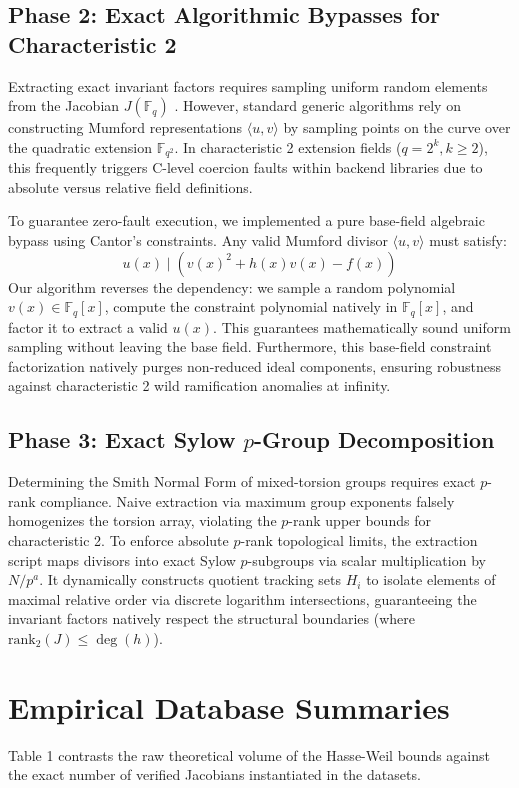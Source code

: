 \documentclass[letterpaper, 11pt]{article}
\begin{document}
\subsection{Phase 2: Exact Algorithmic Bypasses for Characteristic 2}
Extracting exact invariant factors requires sampling uniform random elements from the Jacobian $J(\mathbb{F}_q)$ \cite{Sutherland2007}. However, standard generic algorithms rely on constructing Mumford representations $\langle u, v \rangle$ \cite{Cantor1987} by sampling points on the curve over the quadratic extension $\mathbb{F}_{q^2}$. In characteristic 2 extension fields ($q = 2^k, k \ge 2$), this frequently triggers C-level coercion faults within backend libraries due to absolute versus relative field definitions.

To guarantee zero-fault execution, we implemented a pure base-field algebraic bypass using Cantor's constraints. Any valid Mumford divisor $\langle u, v \rangle$ must satisfy:
\begin{equation}
    u(x) \mid \left( v(x)^2 + h(x)v(x) - f(x) \right)
\end{equation}
Our algorithm reverses the dependency: we sample a random polynomial $v(x) \in \mathbb{F}_q[x]$, compute the constraint polynomial natively in $\mathbb{F}_q[x]$, and factor it to extract a valid $u(x)$. This guarantees mathematically sound uniform sampling without leaving the base field. Furthermore, this base-field constraint factorization natively purges non-reduced ideal components, ensuring robustness against characteristic 2 wild ramification anomalies at infinity.

\subsection{Phase 3: Exact Sylow \texorpdfstring{$p$}{p}-Group Decomposition}
Determining the Smith Normal Form of mixed-torsion groups requires exact $p$-rank compliance. Naive extraction via maximum group exponents falsely homogenizes the torsion array, violating the $p$-rank upper bounds for characteristic 2. To enforce absolute $p$-rank topological limits, the extraction script maps divisors into exact Sylow $p$-subgroups via scalar multiplication by $N/p^a$. It dynamically constructs quotient tracking sets $H_i$ to isolate elements of maximal relative order via discrete logarithm intersections, guaranteeing the invariant factors natively respect the structural boundaries (where $\text{rank}_2(J) \le \deg(h)$). 

\section{Empirical Database Summaries}
Table 1 contrasts the raw theoretical volume of the Hasse-Weil bounds against the exact number of verified Jacobians instantiated in the datasets.
\end{document}
